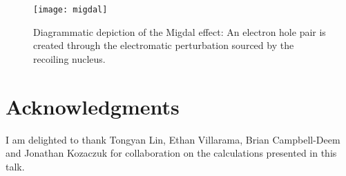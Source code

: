 \documentclass{moriond}
\begin{document}
\begin{figure}
\centerline{\texttt{[image: migdal]}}
\caption[]{Diagrammatic depiction of the Migdal effect: An electron hole pair is created through the electromatic perturbation sourced by the recoiling nucleus.}
\label{fig:migdal}
\end{figure}


\section*{Acknowledgments}

I am delighted to thank Tongyan Lin, Ethan Villarama, Brian Campbell-Deem and Jonathan Kozaczuk for collaboration on the calculations presented in this talk.


\end{document}
